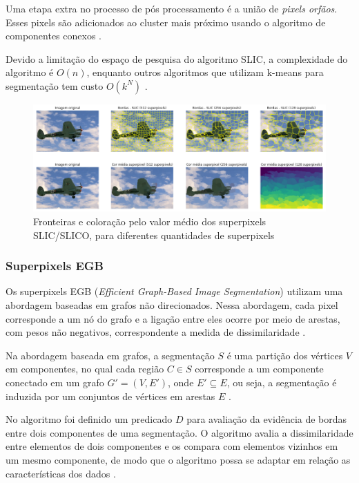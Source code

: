 \begin{document}
Uma etapa extra no processo de pós processamento é a união de \textit{pixels orfãos}. Esses pixels são adicionados ao cluster mais próximo usando o algoritmo de componentes conexos \cite{SLIC}.

Devido a limitação do espaço de pesquisa do algoritmo SLIC, a complexidade do algoritmo é $O(n)$, enquanto outros algoritmos que utilizam k-means para segmentação tem custo $O(k^N)$ \cite{SLIC}.

\begin{figure}[ht]
\centering
\includegraphics[width=1.\textwidth]{slic_segmentation_compare.png}
\caption{Fronteiras e coloração pelo valor médio dos superpixels SLIC/SLICO, para diferentes quantidades de superpixels}
\label{fig:SLICO}
\end{figure}


\subsubsection{Superpixels EGB} \label{sssec:egb}

Os superpixels EGB (\textit{Efficient Graph-Based Image Segmentation}) utilizam uma abordagem baseadas em grafos não direcionados. Nessa abordagem, cada pixel corresponde a um nó do grafo e a ligação entre eles ocorre por meio de arestas, com pesos não negativos, correspondente a medida de dissimilaridade \cite{FELZENSZWALB}. 

Na abordagem baseada em grafos, a segmentação $S$ é uma partição dos vértices $V$ em componentes, no qual cada região $C \in S$ corresponde a um componente conectado em um grafo $G'=(V,E')$, onde $E' \subseteq E$, ou seja, a segmentação é induzida por um conjuntos de vértices em arestas $E$ \cite{FELZENSZWALB}.

No algoritmo foi definido um predicado $D$ para avaliação da evidência de bordas entre dois componentes de uma segmentação. O algoritmo avalia a dissimilaridade entre elementos de dois componentes e os compara com elementos vizinhos em um mesmo componente, de modo que o algoritmo possa se adaptar em relação as características dos dados \cite{FELZENSZWALB}. 
\end{document}

